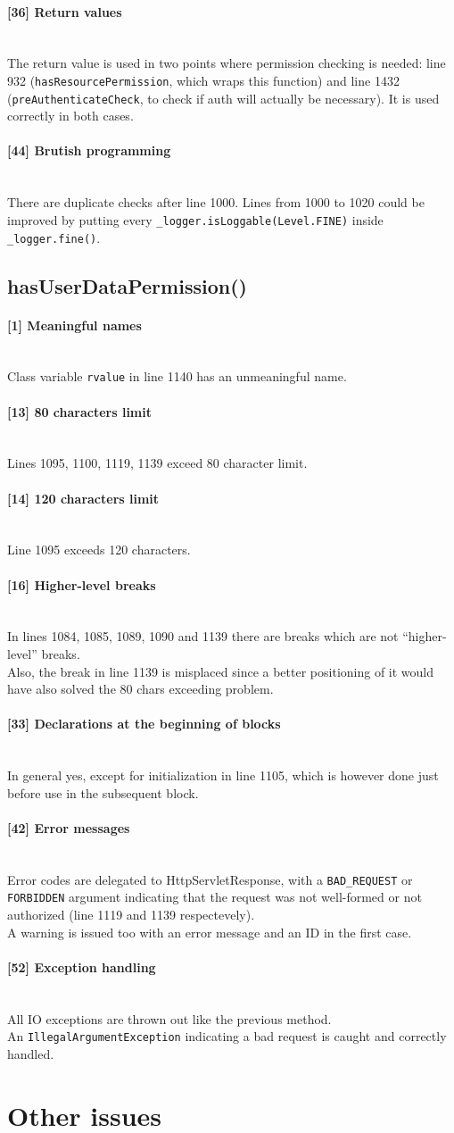 \documentclass[a4paper, 11pt]{article}
\newcommand{\code}[1]{\texttt{#1}}
\newcommand{\issue}[3][?]{
    \paragraph{[#1] #2} \mbox{}\\ #3
}
\begin{document}
\issue[36]{Return values} {
The return value is used in two points where permission checking is needed: 
line 932 (\code{hasResourcePermission}, which wraps this function) 
and line 1432 (\code{preAuthenticateCheck}, to check if auth will actually 
be necessary). It is used correctly in both cases.
}

\issue[44]{Brutish programming} {
There are duplicate checks after line 1000. 
Lines from 1000 to 1020 could be improved by putting every
\code{\_logger.isLoggable(Level.FINE)} inside \\ \code{\_logger.fine()}.
}

\subsection{hasUserDataPermission()}
\issue[1]{Meaningful names} {
    Class variable \code{rvalue} in line 1140 has an unmeaningful name.
}

\issue[13]{80 characters limit}{
    Lines 1095, 1100, 1119, 1139 exceed 80 character limit.
}

\issue[14]{120 characters limit} {
    Line 1095 exceeds 120 characters.
}

\issue[16]{Higher-level breaks} {
In lines 1084, 1085, 1089, 1090 and 1139 there are breaks which are not
``higher-level''  breaks. \\
Also, the break in line 1139 is misplaced since a better positioning of it 
would have also solved the 80 chars exceeding problem.
}

\issue[33]{Declarations at the beginning of blocks} {
In general yes, except for initialization in line 1105, which is however done 
just before use in the subsequent block.
}

\issue[42]{Error messages} {
Error codes are delegated to HttpServletResponse, with a \code{BAD\_REQUEST}
or \code{FORBIDDEN} argument indicating that the request was not well-formed 
or not authorized (line 1119 and 1139 respectevely). \\ 
A warning is issued too with an error message and an ID in the first case.
}

\issue[52]{Exception handling} {
All IO exceptions are thrown out like the previous method. \\
An \code{IllegalArgumentException} indicating a bad request is caught 
and correctly handled.
}


\section{Other issues}
\end{document}
